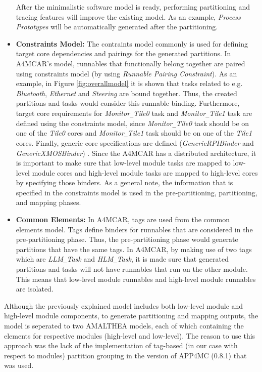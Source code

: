 \begin{itemize}
	After the minimalistic software model is ready, performing partitioning and tracing features will improve the existing model. As an example, \textit{Process Prototypes} will be automatically generated after the partitioning.
	\item \textbf{Constraints Model:} The contraints model commonly is used for defining target core dependencies and pairings for the generated partitions. In A4MCAR's model, runnables that functionally belong together are paired using constraints model (by using \textit{Runnable Pairing Constraint}). As an example, in Figure \ref{fig:overallmodel} it is shown that tasks related to e.g. \textit{Bluetooth}, \textit{Ethernet} and \textit{Steering} are bound together. Thus, the created partitions and tasks would consider this runnable binding. Furthermore, target core requirements for \textit{Monitor\texttt{\_}Tile0} task and \textit{Monitor\texttt{\_}Tile1} task are defined using the constraints model, since \textit{Monitor\texttt{\_}Tile0} task should be on one of the \textit{Tile0} cores and \textit{Monitor\texttt{\_}Tile1} task should be on one of the \textit{Tile1} cores. Finally, generic core specifications are defined (\textit{GenericRPIBinder} and \textit{GenericXMOSBinder}) . Since the A4MCAR has a distributed architecture, it is important to make sure that low-level module tasks are mapped to low-level module cores and high-level module tasks are mapped to high-level cores by specifying those binders.
	As a general note, the information that is specified in the constraints model is used in the pre-partitioning, partitioning, and mapping phases.
	\item \textbf{Common Elements:} In A4MCAR, tags are used from the common elements model. Tags define binders for runnables that are considered in the pre-partitioning phase. Thus, the pre-partitioning phase would generate partitions that have the same tags. In A4MCAR, by making use of two tags which are \textit{LLM\texttt{\_}Task} and \textit{HLM\texttt{\_}Task}, it is made sure that generated partitions and tasks will not have runnables that run on the other module. This means that low-level module runnables and high-level module runnables are isolated.   
\end{itemize}
Although the previously explained model includes both low-level module and high-level module components, to generate partitioning and mapping outputs, the model is seperated to two AMALTHEA models, each of which containing the elements for respective modules (high-level and low-level). The reason to use this approach was the lack of the implementation of tag-based (in our case with respect to modules) partition grouping in the version of APP4MC (0.8.1) that was used. 

